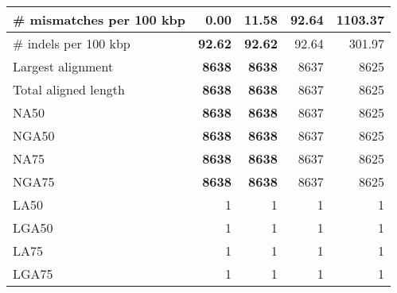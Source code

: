 \documentclass[12pt,a4paper]{article}
\begin{document}
\begin{table}[ht]
\begin{center}
\begin{tabular}{|l*{4}{|r}|}
\# mismatches per 100 kbp & {\bf 0.00} & 11.58 & 92.64 & 1103.37 \\ \hline
\# indels per 100 kbp & {\bf 92.62} & {\bf 92.62} & 92.64 & 301.97 \\ \hline
Largest alignment & {\bf 8638} & {\bf 8638} & 8637 & 8625 \\ \hline
Total aligned length & {\bf 8638} & {\bf 8638} & 8637 & 8625 \\ \hline
NA50 & {\bf 8638} & {\bf 8638} & 8637 & 8625 \\ \hline
NGA50 & {\bf 8638} & {\bf 8638} & 8637 & 8625 \\ \hline
NA75 & {\bf 8638} & {\bf 8638} & 8637 & 8625 \\ \hline
NGA75 & {\bf 8638} & {\bf 8638} & 8637 & 8625 \\ \hline
LA50 & 1 & 1 & 1 & 1 \\ \hline
LGA50 & 1 & 1 & 1 & 1 \\ \hline
LA75 & 1 & 1 & 1 & 1 \\ \hline
LGA75 & 1 & 1 & 1 & 1 \\ \hline
\end{tabular}
\end{center}
\end{table}
\end{document}
